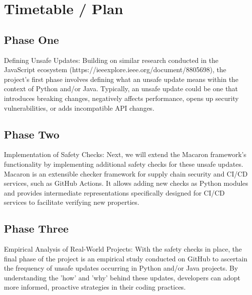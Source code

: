 \section{Timetable / Plan}



\subsection{Phase One}
Defining Unsafe Updates: Building on similar research conducted in the JavaScript ecosystem 
(https://ieeexplore.ieee.org/document/8805698), the project's first phase 
involves defining what an unsafe update means within the context of Python and/or Java. 
Typically, an unsafe update could be one that introduces breaking changes, 
negatively affects performance, opens up security vulnerabilities, 
or adds incompatible API changes.

\subsection{Phase Two}
Implementation of Safety Checks: Next, we will extend the Macaron framework's 
functionality by implementing additional safety checks for these unsafe updates.
Macaron is an extensible checker framework for supply chain security and CI/CD services,
such as GitHub Actions. It allows adding new checks as Python modules and provides 
intermediate representations specifically designed for CI/CD services to facilitate 
verifying new properties.

\subsection{Phase Three}
Empirical Analysis of Real-World Projects: With the safety checks in place, 
the final phase of the project is an empirical study conducted on GitHub to ascertain
the frequency of unsafe updates occurring in Python and/or Java projects.
By understanding the 'how' and 'why' behind these updates, developers can adopt more 
informed, proactive strategies in their coding practices.




